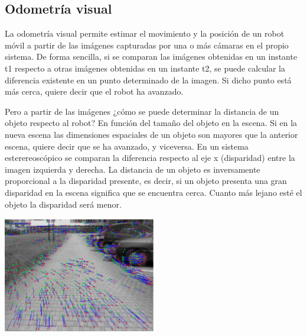 \subsection{Odometría visual}
La odometría visual permite estimar el movimiento y la posición de un robot
móvil a partir de las imágenes capturadas por una o más cámaras en el propio
sistema. De forma sencilla, si se comparan las imágenes obtenidas en un instante
t1 respecto a otras imágenes obtenidas en un instante t2, se puede calcular la
diferencia existente en un punto determinado de la imagen. Si dicho punto está
más cerca, quiere decir que el robot ha avanzado.

Pero a partir de las imágenes ¿cómo se puede determinar la distancia de un
objeto respecto al robot? En función del tamaño del objeto en la escena. Si en
la nueva escena las dimensiones espaciales de un objeto son mayores que la
anterior escena, quiere decir que se ha avanzado, y viceversa. En un sistema
esterereoscópico se comparan la diferencia respecto al eje x (disparidad) entre
la imagen izquierda y derecha. La distancia de un objeto es inversamente
proporcional a la disparidad presente, es decir, si un objeto presenta una gran
disparidad en la escena significa que se encuentra cerca. Cuanto más lejano esté
el objeto la disparidad será menor.


\begin{minipage}{\linewidth}
    \centering
    \includegraphics[width=0.5\textwidth]{images/cap2/OdometriaVisual.eps}
    \label{fig:OdometriaVisual}
\end{minipage}

